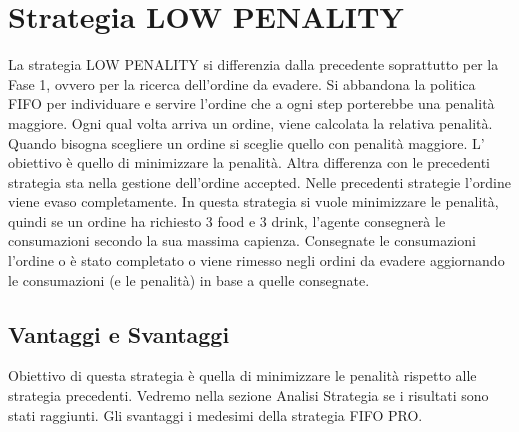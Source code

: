 \section{Strategia LOW PENALITY}
La strategia LOW PENALITY si differenzia dalla precedente soprattutto per la Fase 1, ovvero per la ricerca dell'ordine da evadere. Si abbandona la politica FIFO per individuare e servire l'ordine che a ogni step porterebbe una penalità maggiore. Ogni qual volta arriva un ordine, viene calcolata la relativa penalità. Quando bisogna scegliere un ordine si sceglie quello con penalità maggiore. L' obiettivo è quello di minimizzare la penalità.
Altra differenza con le precedenti strategia sta nella gestione dell'ordine accepted. Nelle precedenti strategie l'ordine viene evaso completamente. In questa strategia si vuole minimizzare le penalità, quindi se un ordine ha richiesto 3 food e 3 drink, l'agente consegnerà le consumazioni secondo la sua massima capienza. Consegnate le consumazioni l'ordine o è stato completato o viene rimesso negli ordini da evadere aggiornando le consumazioni (e le penalità) in base a quelle consegnate.

\subsection{Vantaggi e Svantaggi}
Obiettivo di questa strategia è quella di minimizzare le penalità rispetto alle strategia precedenti. Vedremo nella sezione Analisi Strategia se i risultati sono stati raggiunti. Gli svantaggi i medesimi della strategia FIFO PRO.